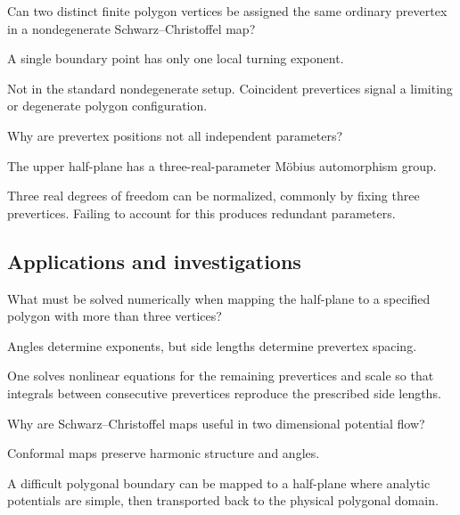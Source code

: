 \begin{exercise}\label{exr:iv18-expand-11}
Can two distinct finite polygon vertices be assigned the same ordinary prevertex in a nondegenerate Schwarz--Christoffel map?
\end{exercise}
\begin{hint}
A single boundary point has only one local turning exponent.
\end{hint}
\begin{solution}
Not in the standard nondegenerate setup. Coincident prevertices signal a limiting or degenerate polygon configuration.
\end{solution}

\begin{exercise}\label{exr:iv18-expand-12}
Why are prevertex positions not all independent parameters?
\end{exercise}
\begin{hint}
The upper half-plane has a three-real-parameter Möbius automorphism group.
\end{hint}
\begin{solution}
Three real degrees of freedom can be normalized, commonly by fixing three prevertices. Failing to account for this produces redundant parameters.
\end{solution}

\subsection*{Applications and investigations}

\begin{exercise}\label{exr:iv18-expand-13}
What must be solved numerically when mapping the half-plane to a specified polygon with more than three vertices?
\end{exercise}
\begin{hint}
Angles determine exponents, but side lengths determine prevertex spacing.
\end{hint}
\begin{solution}
One solves nonlinear equations for the remaining prevertices and scale so that integrals between consecutive prevertices reproduce the prescribed side lengths.
\end{solution}

\begin{exercise}\label{exr:iv18-expand-14}
Why are Schwarz--Christoffel maps useful in two dimensional potential flow?
\end{exercise}
\begin{hint}
Conformal maps preserve harmonic structure and angles.
\end{hint}
\begin{solution}
A difficult polygonal boundary can be mapped to a half-plane where analytic potentials are simple, then transported back to the physical polygonal domain.
\end{solution}

